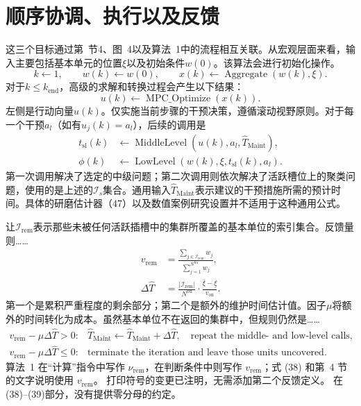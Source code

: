 \documentclass{article}
\begin{document}
\section*{顺序协调、执行以及反馈}
这三个目标通过第~节4、图~4以及算法~1中的流程相互关联。从宏观层面来看，输入主要包括基本单元的位置$\xi$以及初始条件$w(0)$。该算法会进行初始化操作。
\[
k\leftarrow1,\qquad w(k)\leftarrow w(0),\qquad
x(k)\leftarrow\operatorname{Aggregate}(w(k),\xi).
\]
对于$k\leq k_{\mathrm{end}}$，高级的求解和转换过程会产生以下结果：
\[
u(k)\leftarrow\operatorname{MPC\_Optimize}(x(k)).
\]
左侧是行动向量$u(k)$。仅实施当前步骤的干预决策，遵循滚动视野原则。对于每一个干预$a_l$（如有$u_j(k)=a_l$），后续的调用是
\[
\begin{aligned}
t_{\mathrm{sl}}(k)&\leftarrow\operatorname{MiddleLevel}(u(k),a_l,\widehat T_{\mathrm{Maint}}),\\
\phi(k)&\leftarrow\operatorname{LowLevel}(w(k),\xi,t_{\mathrm{sl}}(k),a_l).
\end{aligned}
\]
第一次调用解决了选定的中级问题；第二次调用则依次解决了活跃槽位上的聚类问题，使用的是上述的$\mathcal I_s$集合。通用输入$\widehat T_{\mathrm{Maint}}$表示建议的干预措施所需的预计时间。具体的研磨估计器（47）以及数值案例研究设置并不适用于这种通用公式。

让$\mathcal I_{\mathrm{rem}}$表示那些未被任何活跃插槽中的集群所覆盖的基本单位的索引集合。反馈量则……
\begin{align}
v_{\mathrm{rem}}&=
\frac{\displaystyle\sum_{j\in\mathcal I_{\mathrm{rem}}}w_j}
{\displaystyle\sum_{j=1}^{N^{\mathrm{bu}}}w_j}, \tag{38}\\
\Delta\widehat T&=
\frac{|\mathcal I_{\mathrm{rem}}|}{N^{\mathrm{bu}}}
\cdot\frac{\bar\xi-\underline\xi}{v_{\mathrm{on}}}. \tag{39}
\end{align}
第一个是累积严重程度的剩余部分；第二个是额外的维护时间估计值。因子$\mu$将额外的时间转化为成本。虽然基本单位不在返回的集群中，但规则仍然是……
\[
\begin{array}{ll}
v_{\mathrm{rem}}-\mu\Delta\widehat T>0:
&\widehat T_{\mathrm{Maint}}\leftarrow\widehat T_{\mathrm{Maint}}+\Delta\widehat T,
\quad\text{repeat the middle- and low-level calls},\\[2pt]
v_{\mathrm{rem}}-\mu\Delta\widehat T\leq0:
&\text{terminate the iteration and leave those units uncovered}.
\end{array}
\]
算法~1 在“计算”指令中写作 $\nu_{\mathrm{rem}}$，在判断条件中则写作 $v_{\mathrm{rem}}$；式 (38) 和第~4 节的文字说明使用 $v_{\mathrm{rem}}$。 打印符号的变更已注明，无需添加第二个反馈定义。 在(38)--(39)部分，没有提供零分母的约定。
\end{document}
